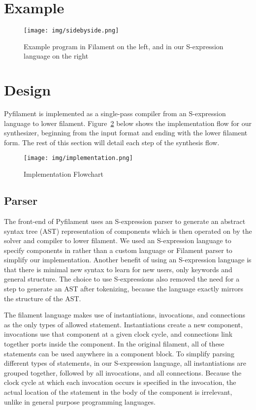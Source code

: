 \documentclass[12pt,a4paper]{article}
\begin{document}
\section{Example}

\begin{figure}[htbp]
    \centering
    \texttt{[image: img/sidebyside.png]}
    \caption{Example program in Filament on the left, and in our S-expression language on the right}
    \label{fig:ex}
\end{figure}

\section{Design}
Pyfilament is implemented as a single-pass compiler from an S-expression language to lower filament. Figure~\ref{fig:imp} below shows the implementation flow for our synthesizer, beginning from the input format and ending with the lower filament form. The rest of this section will detail each step of the synthesis flow.

\begin{figure}[htbp]
    \centering
    \texttt{[image: img/implementation.png]}
    \caption{Implementation Flowchart}
    \label{fig:imp}
\end{figure}

\subsection{Parser}
The front-end of Pyfilament uses an S-expression parser to generate an abstract syntax tree (AST) representation of components which is then operated on by the solver and compiler to lower filament. We used an S-expression language to specify components in rather than a custom language or Filament parser to simplify our implementation. Another benefit of using an S-expression language is that there is minimal new syntax to learn for new users, only keywords and general structure. The choice to use S-expressions also removed the need for a step to generate an AST after tokenizing, because the language exactly mirrors the structure of the AST.

The filament language makes use of instantiations, invocations, and connections as the only types of allowed statement. Instantiations create a new component, invocations use that component at a given clock cycle, and connections link together ports inside the component. In the original filament, all of these statements can be used anywhere in a component block. To simplify parsing different types of statements, in our S-expression language, all instantiations are grouped together, followed by all invocations, and all connections. Because the clock cycle at which each invocation occurs is specified in the invocation, the actual location of the statement in the body of the component is irrelevant, unlike in general purpose programming languages.
\end{document}
